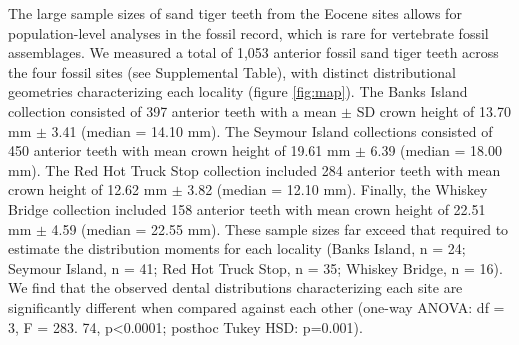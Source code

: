 \documentclass[]{rsos}%
\begin{document}
The large sample sizes of sand tiger teeth from the Eocene sites allows for population-level analyses in the fossil record, which is rare for vertebrate fossil assemblages.
We measured a total of 1,053 anterior fossil sand tiger teeth across the four fossil sites (see Supplemental Table), with distinct distributional geometries characterizing each locality (figure \ref{fig:map}).
The Banks Island collection consisted of 397 anterior teeth with a mean $\pm$ SD crown height of 13.70 mm $\pm$ 3.41 (median = 14.10 mm). 
The Seymour Island collections consisted of 450 anterior teeth with mean crown height of 19.61 mm $\pm$ 6.39 (median = 18.00 mm).
The Red Hot Truck Stop collection included 284 anterior teeth with mean crown height of 12.62 mm $\pm$ 3.82 (median = 12.10 mm).
Finally, the Whiskey Bridge collection included 158 anterior teeth with mean crown height of 22.51 mm $\pm$ 4.59 (median = 22.55 mm). 
These sample sizes far exceed that required to estimate the distribution moments for each locality (Banks Island, n = 24; Seymour Island, n = 41; Red Hot Truck Stop, n = 35; Whiskey Bridge, n = 16).
We find that the observed dental distributions characterizing each site are significantly different when compared against each other (one-way ANOVA: df = 3, F = 283. 74, p<0.0001; posthoc Tukey HSD: p=0.001). 






\end{document}
